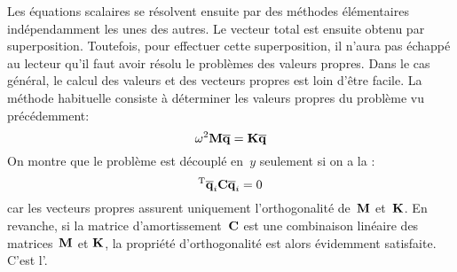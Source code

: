 Les équations scalaires se résolvent ensuite par des méthodes élémentaires indépendamment
les unes des autres. Le vecteur total est ensuite obtenu par superposition.
\medskipvm
Toutefois, pour effectuer cette superposition, il n'aura pas échappé au lecteur qu'il faut
avoir résolu le problèmes des valeurs propres.
Dans le cas général, le calcul des valeurs et des vecteurs propres  est loin
d'être facile.
La méthode habituelle consiste à déterminer les valeurs propres  du
problème vu précédemment:
\begin{equation} \omega^2\MM{M}\VV{\overline{q}}=\MM{K}\VV{\overline{q}} \end{equation}
On montre que le problème est découplé en~$y$ seulement si on a la : \begin{equation}\LL{\overline{q}}_i\MM{C}\VV{\overline{q}}_i=0\end{equation}
\medskipvm
{} car les vecteurs propres assurent uniquement
l'orthogonalité de~$\MM{M}$ et~$\MM{K}$.
\medskipvm
En revanche, si la matrice d'amortissement~$\MM{C}$ est une combinaison linéaire des matrices~$\MM{M}$ et
$\MM{K}$, la propriété d'orthogonalité est alors évidemment satisfaite.
C'est l'.

